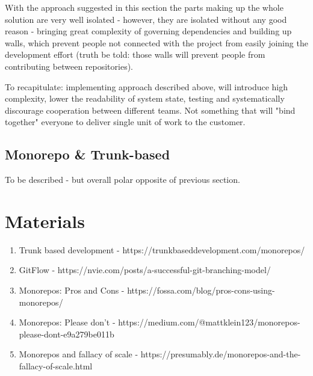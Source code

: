\documentclass{article}
\begin{document}
With the approach suggested in this section the parts making up the whole solution are very well isolated - however, they are isolated without any good reason - bringing great complexity of governing dependencies and building up walls,
which prevent people not connected with the project from easily joining the development effort (truth be told: those walls will prevent people from contributing between repositories).

To recapitulate: implementing approach described above, will introduce high complexity, lower the readability of system state, testing and systematically discourage cooperation between different teams. Not something that will "bind together"
everyone to deliver single unit of work to the customer. 


\subsection{Monorepo \& Trunk-based}
To be described - but overall polar opposite of previous section.

\section{Materials}
\begin{enumerate}
	\item Trunk based development - https://trunkbaseddevelopment.com/monorepos/
	\item GitFlow - https://nvie.com/posts/a-successful-git-branching-model/
	\item Monorepos: Pros and Cons - https://fossa.com/blog/pros-cons-using-monorepos/
	\item Monorepos: Please don't - https://medium.com/@mattklein123/monorepos-please-dont-e9a279be011b
	\item Monorepos and fallacy of scale - https://presumably.de/monorepos-and-the-fallacy-of-scale.html
\end{enumerate}
\end{document}
